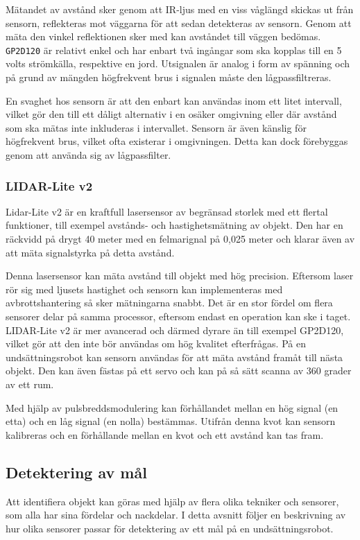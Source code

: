 \documentclass[11pt]{article}
\begin{document}
\begin{flushleft}
Mätandet av avstånd sker genom att IR-ljus med en viss våglängd skickas ut från sensorn, reflekteras mot väggarna för att sedan detekteras av sensorn. Genom att mäta den vinkel reflektionen sker med kan avståndet till väggen bedömas. \verb+GP2D120+ är relativt enkel och har enbart två ingångar som ska kopplas till en 5 volts strömkälla, respektive en jord.  Utsignalen är analog i form av spänning och på grund av mängden högfrekvent brus i signalen måste den lågpassfiltreras. \cite{Sharp}

En svaghet hos sensorn är att den enbart kan användas inom ett litet intervall, vilket gör den till ett dåligt alternativ i en osäker omgivning eller där avstånd som ska mätas inte inkluderas i intervallet. Sensorn är även känslig för högfrekvent brus, vilket ofta existerar i omgivningen. Detta kan dock förebyggas genom att använda sig av lågpassfilter. \cite{Sharp}

\subsubsection{LIDAR-Lite v2}
Lidar-Lite v2 är en kraftfull lasersensor av begränsad storlek med ett flertal funktioner, till exempel avstånds- och hastighetsmätning av objekt. Den har en räckvidd på drygt 40 meter med en felmarignal på 0,025 meter och klarar även av att mäta signalstyrka på detta avstånd. \cite{Lidar}

Denna lasersensor kan mäta avstånd till objekt med hög precision. Eftersom laser rör sig med ljusets hastighet och sensorn kan implementeras med avbrottshantering så sker mätningarna snabbt. Det är en stor fördel om flera sensorer delar på samma processor, eftersom endast en operation kan ske i taget. LIDAR-Lite v2 är mer avancerad och därmed dyrare än till exempel GP2D120, vilket gör att den inte bör användas om hög kvalitet efterfrågas. På en undsättningsrobot kan sensorn användas för att mäta avstånd framåt till nästa objekt. Den kan även fästas på ett servo och kan på så sätt scanna av 360 grader av ett rum. \cite{Lidar}

Med hjälp av pulsbreddsmodulering kan förhållandet mellan en hög signal (en etta) och en låg signal (en nolla) bestämmas. Utifrån denna kvot kan sensorn kalibreras och en förhållande mellan en kvot och ett avstånd kan tas fram. \cite{Lidar}

\subsection{Detektering av mål}
Att identifiera objekt kan göras med hjälp av flera olika tekniker och sensorer, som alla har sina fördelar och nackdelar. I detta avsnitt följer en beskrivning av hur olika sensorer passar för detektering av ett mål på en undsättningsrobot.



\end{flushleft}
\end{document}
